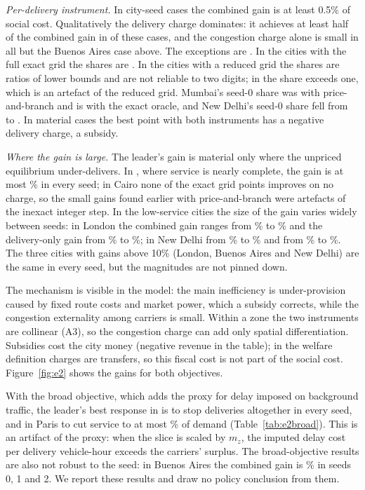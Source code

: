 \documentclass[preprint,12pt]{elsarticle}
\theoremstyle{definition}
\theoremstyle{remark}
\begin{document}
\emph{Per-delivery instrument.} In \EtwoMaterialN{} city-seed cases the combined gain is at least 0.5\% of social cost. Qualitatively the delivery charge dominates: it achieves at least half of the combined gain in \EtwoShareGeHalfN{} of these cases, and the congestion charge alone is small in all but the Buenos Aires case above. The exceptions are \EtwoShareLowCases. In the cities with the full exact grid the shares are \EtwoShareFullRanges. In the cities with a reduced grid the shares are ratios of lower bounds and are not reliable to two digits; in \EtwoShareAboveOne{} the share exceeds one, which is an artefact of the reduced grid. Mumbai's seed-0 share was \ExMumbaiShareOld{} with price-and-branch and is \ExMumbaiShareNew{} with the exact oracle, and New Delhi's seed-0 share fell from \ExDelhiShareOld{} to \ExDelhiShareNew. In \EtwoSubsidyMaterial{} material cases the best point with both instruments has a negative delivery charge, a subsidy.

\emph{Where the gain is large.} The leader's gain is material only where the unpriced equilibrium under-delivers. In \EtwoSmallCities{}, where service is nearly complete, the gain is at most \EtwoSmallMax\% in every seed; in Cairo none of the exact grid points improves on no charge, so the small gains found earlier with price-and-branch were artefacts of the inexact integer step. In the low-service cities the size of the gain varies widely between seeds: in London the combined gain ranges from \EtwoLondonBothMin\% to \EtwoLondonBothMax\% and the delivery-only gain from \EtwoLondonDelMin\% to \EtwoLondonDelMax\%; in New Delhi from \EtwoDelhiBothMin\% to \EtwoDelhiBothMax\% and from \EtwoDelhiDelMin\% to \EtwoDelhiDelMax\%. The three cities with gains above 10\% (London, Buenos Aires and New Delhi) are the same in every seed, but the magnitudes are not pinned down.

The mechanism is visible in the model: the main inefficiency is under-provision caused by fixed route costs and market power, which a subsidy corrects, while the congestion externality among carriers is small. Within a zone the two instruments are collinear (A3), so the congestion charge can add only spatial differentiation. Subsidies cost the city money (negative revenue in the table); in the welfare definition charges are transfers, so this fiscal cost is not part of the social cost. Figure~\ref{fig:e2} shows the gains for both objectives.

With the broad objective, which adds the proxy for delay imposed on background traffic, the leader's best response in \EtwoBroadShutdownCities{} is to stop deliveries altogether in every seed, and in Paris to cut service to at most \EtwoBroadParisServedMax\% of demand (Table~\ref{tab:e2broad}). This is an artifact of the proxy: when the slice is scaled by $m_z$, the imputed delay cost per delivery vehicle-hour exceeds the carriers' surplus. The broad-objective results are also not robust to the seed: in Buenos Aires the combined gain is \EtwoBroadBA\% in seeds 0, 1 and 2. We report these results and draw no policy conclusion from them.
\end{document}
